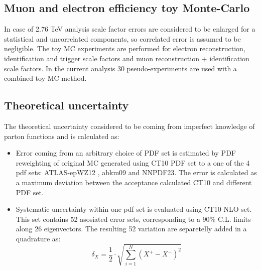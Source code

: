 \subsection{Muon and electron efficiency toy Monte-Carlo}
 In case of 2.76 TeV analysis scale factor errors are considered to be enlarged for a statistical and uncorrelated components, so correlated error is assumed to be negligible. The toy MC experiments are performed for electron reconstruction, identification and trigger scale factors and muon reconstruction + identification scale factors.  In the current analysis 30 pseudo-experiments are used with a combined toy MC method. 
 
 \subsection{Theoretical uncertainty}\label{sec:TheoCw}
 
 The theoretical uncertainty considered to be coming from imperfect knowledge of parton functions and is calculated as:
 \begin{itemize}
 \item  Error coming from an arbitrary choice of PDF set is estimated by PDF reweighting \cite{PDFRew} of original MC generated using CT10 PDF set to a one of the 4 pdf sets: ATLAS-epWZ12 \cite{ATLASEP}, abkm09\cite{ABM09} and NNPDF23\cite{NNPDF23}. The error is calculated as a maximum deviation between the acceptance calculated CT10 and different PDF set. 
\item Systematic uncertainty within one pdf set  is evaluated using CT10 NLO set. This set contains 52 asosiated error sets, corresponding to a 90\% C.L. limits along 26 eigenvectors. The resulting 52 variation are separetelly added in a quadrature as:
\begin{equation}\label{eq:PDF}
\delta_X=\frac{1}{2}\cdot \sqrt{\sum_{i=1}^{N}(X^+-X^-)^2}
\end{equation}
\end{itemize}
 
 

